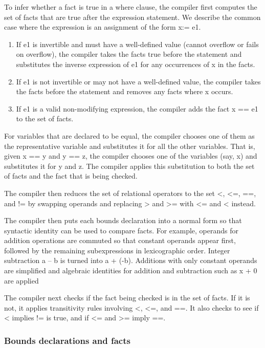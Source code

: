 \documentclass[]{article}
\begin{document}
To infer whether a fact is true in a where clause, the compiler first
computes the set of facts that are true after the expression statement.
We describe the common case where the expression is an assignment of the
form x:= e1.

\begin{enumerate}
\def\labelenumi{\arabic{enumi}.}
\item
  If e1 is invertible and must have a well-defined value (cannot
  overflow or fails on overflow), the compiler takes the facts true
  before the statement and substitutes the inverse expression of e1 for
  any occurrences of x in the facts.
\item
  If e1 is not invertible or may not have a well-defined value, the
  compiler takes the facts before the statement and removes any facts
  where x occurs.
\item
  If e1 is a valid non-modifying expression, the compiler adds the fact
  x == e1 to the set of facts.
\end{enumerate}

For variables that are declared to be equal, the compiler chooses one of
them as the representative variable and substitutes it for all the other
variables. That is, given x == y and y == z, the compiler chooses one of
the variables (say, x) and substitutes it for y and z. The compiler
applies this substitution to both the set of facts and the fact that is
being checked.

The compiler then reduces the set of relational operators to the set
\textless{}, \textless{}=, ==, and != by swapping operands and replacing
\textgreater{} and \textgreater{}= with \textless{}= and \textless{}
instead.

The compiler then puts each bounds declaration into a normal form so
that syntactic identity can be used to compare facts. For example,
operands for addition operations are commuted so that constant operands
appear first, followed by the remaining subexpressions in lexicographic
order. Integer subtraction a -- b is turned into a + (-b). Additions
with only constant operands are simplified and algebraic identities for
addition and subtraction such as x + 0 are applied

The compiler next checks if the fact being checked is in the set of
facts. If it is not, it applies transitivity rules involving
\textless{}, \textless{}=, and ==. It also checks to see if \textless{}
implies != is true, and if \textless{}= and \textgreater{}= imply ==.

\subsubsection{\texorpdfstring{\protect\hypertarget{ux5fToc420589190}{}{\protect\hypertarget{ux5fToc422906981}{}{\protect\hypertarget{ux5fToc424307721}{}{\protect\hypertarget{ux5fToc426641119}{}{\protect\hypertarget{ux5fToc435434994}{}{\protect\hypertarget{ux5fToc437460827}{}{\protect\hypertarget{ux5fToc440445508}{}{\protect\hypertarget{ux5fToc440449290}{}{\protect\hypertarget{ux5fToc440551940}{}{}}}}}}}}}Bounds
declarations and
facts}{Bounds declarations and facts}}\label{bounds-declarations-and-facts}
\end{document}
